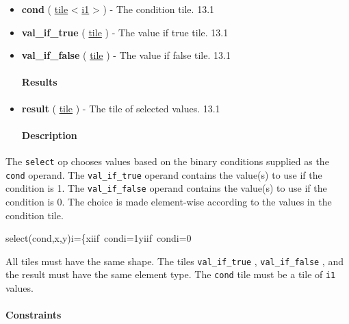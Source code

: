 \documentclass{article}
\begin{document}
\begin{itemize}
\item \textbf{cond} ( \href{https://docs.nvidia.com/cuda/tile-ir/latest/sections/types.html#type-tile}{tile} < \href{https://docs.nvidia.com/cuda/tile-ir/latest/sections/types.html#subsection-element-types}{i1} > ) - The condition tile. 13.1
\item \textbf{val\_if\_true} ( \href{https://docs.nvidia.com/cuda/tile-ir/latest/sections/types.html#type-tile}{tile} ) - The value if true tile. 13.1
\item \textbf{val\_if\_false} ( \href{https://docs.nvidia.com/cuda/tile-ir/latest/sections/types.html#type-tile}{tile} ) - The value if false tile. 13.1


\paragraph{Results}

\item \textbf{result} ( \href{https://docs.nvidia.com/cuda/tile-ir/latest/sections/types.html#type-tile}{tile} ) - The tile of selected values. 13.1


\paragraph{Description}

\end{itemize}
The \texttt{select} op chooses values based on the binary conditions supplied as the \texttt{cond} operand. The \texttt{val\_if\_true} operand contains the value(s) to use if the condition is 1. The \texttt{val\_if\_false} operand contains the value(s) to use if the condition is 0. The choice is made element-wise according to the values in the condition tile.


select(cond,x,y)i=\{xiif condi=1yiif condi=0

All tiles must have the same shape. The tiles \texttt{val\_if\_true} , \texttt{val\_if\_false} , and the result must have the same element type. The \texttt{cond} tile must be a tile of \texttt{i1} values.



\paragraph{Constraints}
\end{document}

